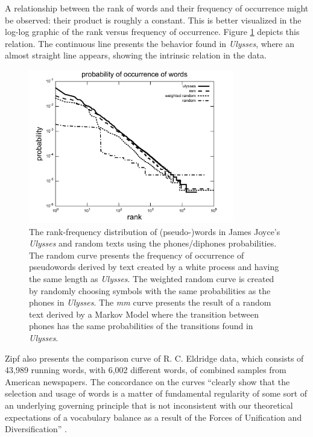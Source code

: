 A relationship between the rank of words and their frequency of occurrence might be observed:
their product is roughly a constant. This is better visualized in the log-log graphic of
the rank versus frequency of occurrence. Figure \ref{fig:ulysses_compared_words_probabilities}
depicts this relation. The continuous line presents the behavior found in \textit{Ulysses}, where 
an almost straight line appears, showing the intrinsic relation in the data. 


\begin{figure}[h]
\centering  
\includegraphics[width=0.8\textwidth]{images/ulysses_compared_words_probabilities.pdf}  
\caption{The rank-frequency distribution of (pseudo-)words in James Joyce's \textit{Ulysses} and random texts using the phones/diphones probabilities. The random curve presents the frequency of occurrence of pseudowords derived by text created by a white process and having the same length as \textit{Ulysses}. The weighted random curve is created by randomly choosing symbols with the same probabilities as the phones in \textit{Ulysses}. The \textit{mm} curve presents the result of a random text derived by a Markov Model where the transition between phones has the same probabilities of the transitions found in \textit{Ulysses}.}
\label{fig:ulysses_compared_words_probabilities}  
\end{figure}  
 
 
Zipf also presents the comparison curve of R. C. Eldridge data, which consists of 
43,989 running words, with 6,002 different words, of combined samples from American
newspapers. The concordance on the curves ``clearly show that the selection and usage
of words is a matter of fundamental regularity of some sort of an underlying governing
principle that is not inconsistent with our theoretical expectations of a vocabulary
balance as a result of the Forces of Unification and Diversification'' \cite{zipf1949}.


